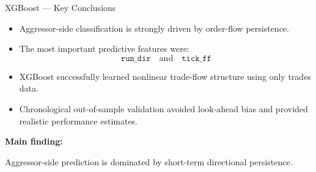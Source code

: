 \documentclass[aspectratio=169,10pt]{beamer}
\begin{document}
\begin{frame}{XGBoost — Key Conclusions}

\large

\begin{itemize}
    \item Aggressor-side classification is strongly driven by order-flow persistence.

    \vspace{0.3cm}

    \item The most important predictive features were:
    \[
    \texttt{run\_dir}
    \quad \text{and} \quad
    \texttt{tick\_ff}
    \]

    \vspace{0.3cm}

    \item XGBoost successfully learned nonlinear trade-flow structure using only trades data.

    \vspace{0.3cm}

    \item Chronological out-of-sample validation avoided look-ahead bias and provided realistic performance estimates.
\end{itemize}

\vspace{0.5cm}

\centering
\Large
\textbf{Main finding:}

\vspace{0.2cm}

Aggressor-side prediction is dominated by short-term directional persistence.

\end{frame}
\end{document}
